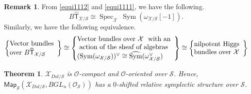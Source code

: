 \documentclass[11pt]{amsart}
\newcommand {\map} {\mathsf{Map}}
\DeclareMathOperator{\Sym}{Sym}
\DeclareMathOperator{\Spec}{Spec}
\theoremstyle{plain}
\numberwithin{equation}{section}
\theoremstyle{definition}
\newtheorem{Rem}[Def]{Remark}
\theoremstyle{plain}
\newtheorem{Thm}[Def]{Theorem}
\begin{document}
\begin{Rem}
From \eqref{equi1112} and \eqref{equi1111}, we have the following.
\begin{equation}\label{equi1}
B\widehat{\mathsf{T}}_{\mathcal X/\mathcal S} \cong \Spec_{\mathcal{X}}~\Sym(\omega_{\mathcal X/\mathcal S}[-1]). 
\end{equation}
Similarly, we have the following equivalence. 
\begin{equation}
\left\{
\begin{array}{@{}ll@{}} 
\text{Vector bundles}\\
\text{over}~ B\widehat{\mathsf{T}}_{\mathcal X/\mathcal S}
\end{array}\right\}
\cong \left\{
\begin{array}{@{}ll@{}} 
\text{Vector bundles over}~ \mathcal X ~~\text{with an}\\
\text{ action of the sheaf of algebras} \\
({\Sym (\omega_{\mathcal X/\mathcal S}}))^{\vee}\cong \widehat{\Sym}(\omega^{\vee}_{\mathcal X/\mathcal S})
\end{array}\right\}
\cong \left\{
\begin{array}{@{}ll@{}} 
\text{nilpotent Higgs}\\
\text{bundles over}~\mathcal X
\end{array}\right\}
\end{equation}
\end{Rem}

\smallskip


\begin{Thm}\label{main}
$\mathcal X_{Dol/\mathcal{S}}$ is $\mathcal O$-compact and $\mathcal O$-oriented over $\mathcal S$. Hence, $\map_{\mathcal S}(\mathcal X_{Dol/\mathcal{S}}, BGL_{n}(\mathcal{O}_{\mathcal{S}}))$ has a $0$-shifted relative symplectic structure over $\mathcal S$.
\end{Thm}

\smallskip
\end{document}
